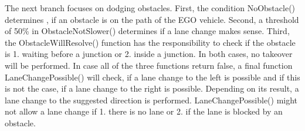 The next branch focuses on dodging obstacles. First, the condition NoObstacle() determines , if an obstacle is on the path of the EGO vehicle. Second, a threshold of 50\% in ObstacleNotSlower() determines if a lane change makes sense. Third, the ObstacleWillResolve() function has the responsibility to check if the obstacle is 1. waiting before a junction or 2. inside a junction. In both cases, no takeover will be performed. In case all of the three functions return false, a final function LaneChangePossible() will check, if a lane change to the left is possible and if this is not the case, if a lane change to the right is possible. Depending on its result, a lane change to the suggested direction is performed. LaneChangePossible() might not allow a lane change if 1. there is no lane or 2. if the lane is blocked by an obstacle.


